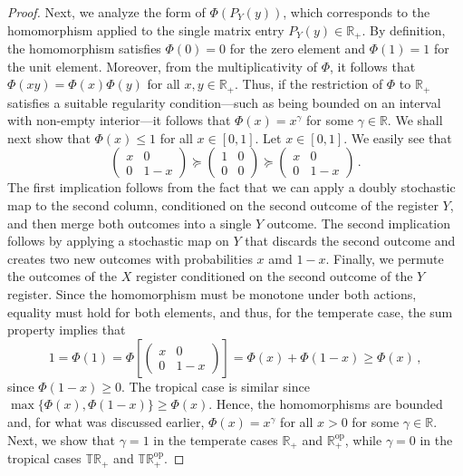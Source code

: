 \documentclass[aps,pra,11pt,onecolumn,nofootinbib,tightenlines]{revtex4-2}
\theoremstyle{definition}
\newcommand{\mb}[1]{\mathbb{#1}}
\begin{document}
\begin{proof}
Next, we analyze the form of $\Phi(P_Y(y))$, which corresponds to the homomorphism applied to the single matrix entry $P_Y(y) \in \mb R_+$. 
By definition, the homomorphism satisfies $\Phi(0) = 0$ for the zero element and $\Phi(1) = 1$ for the unit element.
Moreover, from the multiplicativity of $\Phi$, it follows that $\Phi(xy)=\Phi(x)\Phi(y)$ for all $x,y\in\mb R_+$. Thus, if the restriction of $\Phi$ to $\mathbb{R}_+$ satisfies a suitable regularity condition—such as being bounded on an interval with non-empty interior—it follows that $\Phi(x) = x^\gamma$ for some $\gamma \in \mathbb{R}$.
 We shall next show that $\Phi(x)\leq 1$ for all $x\in[0,1]$. Let $x\in[0,1]$. We easily see that
\begin{equation}\label{eq:x1}
\left(\begin{array}{cc}
x&0\\
0&1-x
\end{array}\right)\succeq\left(\begin{array}{cc}
1&0\\
0&0
\end{array}\right)\succeq\left(\begin{array}{cc}
x&0\\
0&1-x
\end{array}\right) \,.
\end{equation}
The first implication follows from the fact that we can apply a doubly stochastic map to the second column, conditioned on the second outcome of the register $Y$, and then merge both outcomes into a single $Y$ outcome. The second implication follows by applying a stochastic map on $Y$ that discards the second outcome and creates two new outcomes with probabilities $x$ amd $1-x$. Finally, we permute the outcomes of the $X$ register conditioned on the second outcome of the $Y$ register. Since the homomorphism must be monotone under both actions, equality must hold for both elements, and thus, for the temperate case, the sum property implies that
\begin{equation}
1=\Phi(1)=\Phi\left[\left(\begin{array}{cc}
x&0\\
0&1-x
\end{array}\right)\right]=\Phi(x)+\Phi(1-x)\geq\Phi(x) \,,
\end{equation}
since $\Phi(1-x)\geq 0$. The tropical case is similar since $\max\{\Phi(x),\Phi(1-x)\} \geq \Phi(x)$. Hence, the homomorphisms are bounded and, for what was discussed earlier, $\Phi(x)=x^\gamma$ for all $x>0$ for some $\gamma\in\mb R$. Next, we show that $\gamma = 1$ in the temperate cases $\mathbb{R}_+$ and $\mathbb{R}^{\mathrm{op}}_+$, while $\gamma = 0$ in the tropical cases $\mathbb{TR}_+$ and $\mathbb{TR}^{\mathrm{op}}_+$.

\end{proof}
\end{document}
